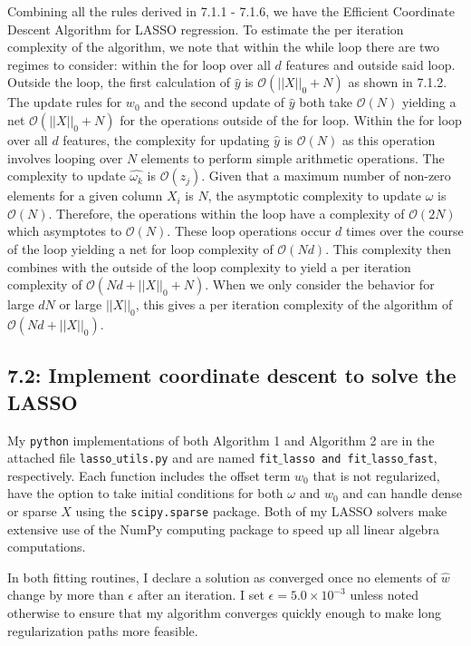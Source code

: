 \documentclass[12pt]{amsart}
\begin{document}
Combining all the rules derived in 7.1.1 - 7.1.6, we have the Efficient Coordinate Descent Algorithm for LASSO regression.  To estimate the per iteration complexity of the algorithm, we note that within the while loop there are two regimes to consider: within the for loop over all $d$ features and outside said loop.  Outside the loop, the first calculation of $\hat{y}$ is $\mathcal{O}(||X||_0 + N)$ as shown in 7.1.2.  The update rules for $w_0$ and the second update of $\hat{y}$ both take $\mathcal{O}(N)$ yielding a net $\mathcal{O}(||X||_0 + N)$ for the operations outside of the for loop.  Within the for loop over all $d$ features, the complexity for updating $\hat{y}$ is $\mathcal{O}(N)$ as this operation involves looping over $N$ elements to perform simple arithmetic operations.  The complexity to update $\hat{\omega_k}$ is $\mathcal{O}(z_j)$.  Given that a maximum number of non-zero elements for a given column $X_i$ is $N$, the asymptotic complexity to update $\hat{\omega}$ is $\mathcal{O}(N)$.  Therefore, the operations within the loop have a complexity of $\mathcal{O}(2N)$ which asymptotes to $\mathcal{O}(N)$.  These loop operations occur $d$ times over the course of the loop yielding a net for loop complexity of $\mathcal{O}(Nd)$.  This complexity then combines with the outside of the loop complexity to yield a per iteration complexity of $\mathcal{O}(Nd + ||X||_0 + N)$.  When we only consider the behavior for large $dN$ or large $||X||_0$, this gives a per iteration complexity of the algorithm of $\mathcal{O}(Nd + ||X||_0)$.

\subsection*{7.2: Implement coordinate descent to solve the LASSO}

My {\tt python} implementations of both Algorithm 1 and Algorithm 2 are in the attached file {\tt lasso$\_$utils.py} and are named {\tt fit$\_$lasso and fit$\_$lasso$\_$fast}, respectively.  Each function includes the offset term $w_0$ that is not regularized, have the option to take initial conditions for both $\omega$ and $w_0$ and can handle dense or sparse $X$ using the {\tt scipy.sparse} package.  Both of my LASSO solvers make extensive use of the NumPy computing package to speed up all linear algebra computations.  

In both fitting routines, I declare a solution as converged once no elements of $\hat{w}$ change by more than $\epsilon$ after an iteration.  I set $\epsilon = 5.0 \times 10^{-3}$ unless noted otherwise to ensure that my algorithm converges quickly enough to make long regularization paths more feasible.  
\end{document}
